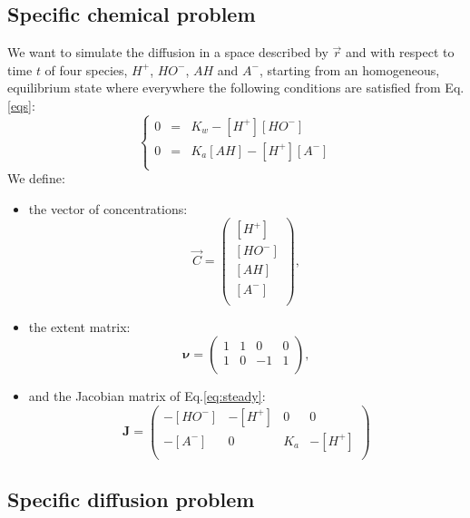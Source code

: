 \documentclass[aps,11pt]{revtex4}
\begin{document}
\subsection{Specific chemical problem}
We want to simulate the diffusion in a space described by $\vec{r}$ and with respect to time $t$ 
of four species, $H^+$, $HO^-$, $AH$ and $A^-$, starting from an homogeneous, equilibrium state where everywhere the following conditions are satisfied from Eq.\eqref{eqs}:
\begin{equation}
\label{eq:steady}
\left\lbrace
\begin{array}{rcl}
0 & = & K_w - [H^+]  [HO^-]\\
0 & = & K_a   [AH] - [H^+][A^-] \\
\end{array}
\right.
\end{equation}
We define:
\begin{itemize}
\item the vector of concentrations:
\begin{equation}
\vec{C} = 
\begin{pmatrix}
[H^+]\\
[HO^-]\\
[AH]\\
[A^-]\\
\end{pmatrix},
\end{equation}

\item the extent matrix:
\begin{equation}
	\bm{\nu} = 
	\begin{pmatrix}
	1 & 1 & 0 & 0 \\
	1 & 0 & -1 & 1\\
	\end{pmatrix},
\end{equation}

\item and the Jacobian matrix of Eq.\ref{eq:steady}:
\begin{equation}
	\bm{J} = 
	\begin{pmatrix}
	-[HO^-] & -[H^+] & 0 & 0 \\
	-[A^-] & 0 & K_a & -[H^+]\\
	\end{pmatrix}
\end{equation}

\end{itemize}

\subsection{Specific diffusion problem}
\end{document}
